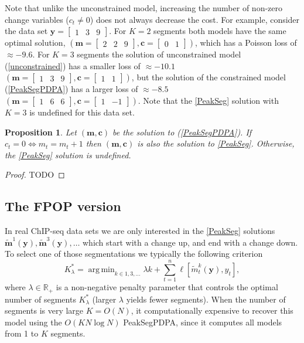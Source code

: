 \documentclass{article}
\newtheorem{Proposition}{Proposition}
\DeclareMathOperator*{\argmin}{arg\,min}
\newcommand{\RR}{\mathbb R}
\begin{document}
Note that unlike the unconstrained model, increasing the number of
non-zero change variables ($c_t\neq 0$) does not always decrease the
cost. For example, consider the data set
$\mathbf y = \left[\begin{array}{ccc}1 & 3 & 9 \end{array}\right]$.
For $K=2$ segments both models have the same optimal solution,
$(\mathbf m = \left[\begin{array}{ccc}2 & 2 & 9 \end{array}\right],
  \mathbf c = \left[\begin{array}{cc}  0 & 1 \end{array}\right])$,
which has a Poisson loss of $\approx -9.6$. 
For $K=3$ segments the solution of unconstrained model
(\ref{unconstrained}) has a smaller loss of $\approx -10.1$
$(\mathbf m = \left[\begin{array}{ccc}1 & 3 & 9 \end{array}\right],
  \mathbf c = \left[\begin{array}{cc}  1 & 1 \end{array}\right])$,
but the solution of the constrained model (\ref{PeakSegPDPA})
has a larger loss of $\approx -8.5$
$(\mathbf m = \left[\begin{array}{ccc}1 & 6 & 6 \end{array}\right],
  \mathbf c = \left[\begin{array}{cc}  1 & -1  \end{array}\right])$. 
Note that the \ref{PeakSeg} solution with $K=3$ is undefined for this data set.

\begin{Proposition}
  Let $(\mathbf m, \mathbf c)$ be the solution to (\ref{PeakSegPDPA}). If
  $c_t=0 \Leftrightarrow m_t = m_t+1$ then $(\mathbf m, \mathbf c)$ is
  also the solution to \ref{PeakSeg}. Otherwise, the \ref{PeakSeg}
  solution is undefined.
\end{Proposition}

\begin{proof}
  TODO
\end{proof}

\subsection{The FPOP version}

In real ChIP-seq data sets we are only interested in the \ref{PeakSeg}
solutions
$\mathbf{\tilde m}^1(\mathbf y), \mathbf{\tilde m}^3(\mathbf y), \dots$
which start with a change up, and end with a change down. To select
one of those segmentations we typically the following criterion
\begin{equation}
  \label{eq:selection}
  K^*_\lambda = \argmin_{k\in 1,3, \dots}
  \lambda k +
\sum_{t=1}^n
  \ell[ \tilde m_t^k(\mathbf y),  y_t ],
\end{equation}
where $\lambda\in\RR_+$ is a non-negative penalty parameter 
that controls the optimal number of segments $K^*_\lambda$
(larger $\lambda$ yields fewer segments).
When the number of segments is very large $K =O(N)$, 
it computationally expensive to recover this model
using the $O(K N\log N)$ PeakSegPDPA, 
since it computes all models from 1 to $K$ segments.
\end{document}
